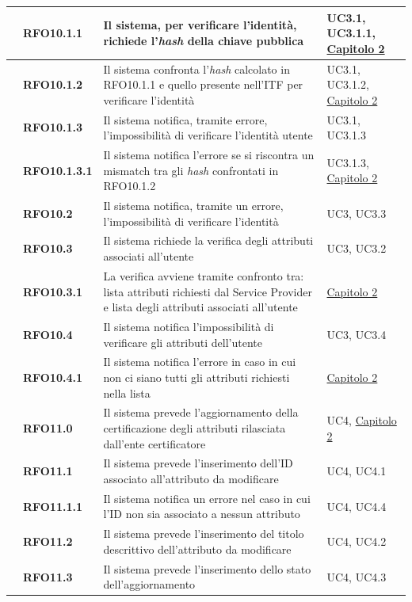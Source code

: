 \begin{longtable}{|r l|p{10cm}|p{2cm}|}
	&\textbf{RFO10.1.1}&Il sistema, per verificare l'identità, richiede l'\textit{hash} della chiave pubblica &UC3.1, UC3.1.1, \hyperref[cap:tecnologie_e_strumenti]{Capitolo 2} \\\hline
	&\textbf{RFO10.1.2}&Il sistema confronta l'\textit{hash} calcolato in RFO10.1.1 e quello presente nell'\gls{ITF} per verificare l'identità& UC3.1, UC3.1.2, \hyperref[cap:tecnologie_e_strumenti]{Capitolo 2} \\\hline
	&\textbf{RFO10.1.3}&Il sistema notifica, tramite errore, l'impossibilità di verificare l'identità utente&UC3.1, UC3.1.3 \\\hline
	&\textbf{RFO10.1.3.1}&Il sistema notifica l'errore se si riscontra un mismatch tra gli \textit{hash} confrontati in RFO10.1.2&UC3.1.3, \hyperref[cap:tecnologie_e_strumenti]{Capitolo 2} \\\hline
	&\textbf{RFO10.2}&Il sistema notifica, tramite un errore, l'impossibilità di verificare l'identità& UC3, UC3.3 \\\hline
	&\textbf{RFO10.3}&Il sistema richiede la verifica degli attributi associati all'utente&UC3, UC3.2 \\\hline
	&\textbf{RFO10.3.1}&La verifica avviene tramite confronto tra: lista attributi richiesti dal Service Provider e lista degli attributi associati all'utente&\hyperref[cap:tecnologie_e_strumenti]{Capitolo 2} \\\hline
	&\textbf{RFO10.4}&Il sistema notifica l'impossibilità di verificare gli attributi dell'utente&UC3, UC3.4 \\\hline
	&\textbf{RFO10.4.1}&Il sistema notifica l'errore in caso in cui non ci siano tutti gli attributi richiesti nella lista&\hyperref[cap:tecnologie_e_strumenti]{Capitolo 2} \\\hline
	&\textbf{RFO11.0}&Il sistema prevede l'aggiornamento della certificazione degli attributi rilasciata dall'ente certificatore &UC4, \hyperref[cap:tecnologie_e_strumenti]{Capitolo 2} \\\hline
	&\textbf{RFO11.1}&Il sistema prevede l'inserimento dell'ID associato all'attributo da modificare&UC4, UC4.1 \\\hline
	&\textbf{RFO11.1.1}&Il sistema notifica un errore nel caso in cui l'ID non sia associato a nessun attributo&UC4, UC4.4 \\\hline
	&\textbf{RFO11.2}&Il sistema prevede l'inserimento del titolo descrittivo dell'attributo da modificare& UC4, UC4.2 \\\hline
	&\textbf{RFO11.3}&Il sistema prevede l'inserimento dello stato dell'aggiornamento&UC4, UC4.3 \\\hline

\end{longtable}

